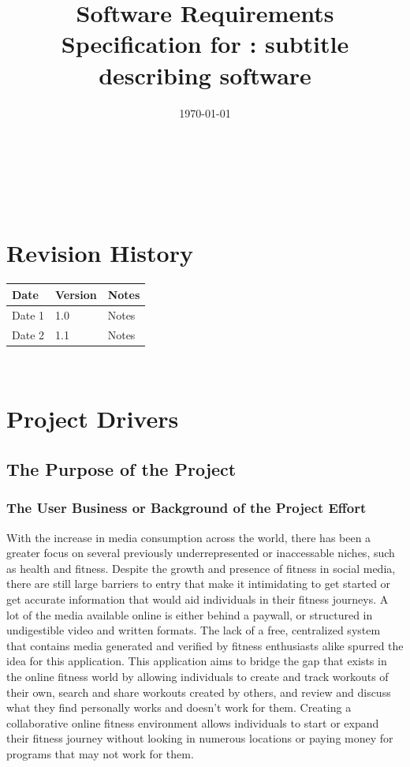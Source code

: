 \documentclass[12pt]{article}
\begin{document}
\title{Software Requirements Specification for \progname: subtitle describing software} 
\author{\authname}
\date{\today}
	
\maketitle

~\newpage


\tableofcontents

~\newpage

\section*{Revision History}

\begin{tabularx}{\textwidth}{p{3cm}p{2cm}X}
\toprule {\bf Date} & {\bf Version} & {\bf Notes}\\
\midrule
Date 1 & 1.0 & Notes\\
Date 2 & 1.1 & Notes\\
\bottomrule
\end{tabularx}

~\newpage

\section{Project Drivers}
\subsection{The Purpose of the Project}
  \subsubsection{The User Business or Background of the Project Effort}
  \noindent
  With the increase in media consumption across the world, there has been a greater focus on several previously underrepresented or inaccessable niches, such as health and fitness. Despite the growth and presence of fitness in social media, there are still large barriers to entry that make it intimidating to get started or get accurate information that would aid individuals in their fitness journeys. A lot of the media available online is either behind a paywall, or structured in undigestible video and written formats. The lack of a free, centralized system that contains media generated and verified by fitness enthusiasts alike spurred the idea for this application. This application aims to bridge the gap that exists in the online fitness world by allowing individuals to create and track workouts of their own, search and share workouts created by others, and review and discuss what they find personally works and doesn't work for them. Creating a collaborative online fitness environment allows individuals to start or expand their fitness journey without looking in numerous locations or paying money for programs that may not work for them. 
\end{document}
